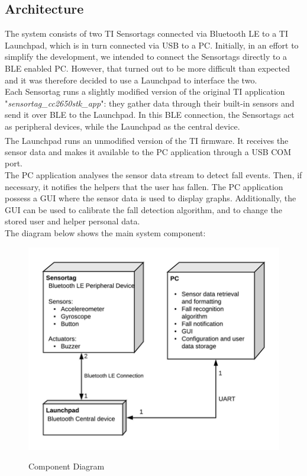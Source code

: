 \documentclass[conference,12pt]{IEEETran}
\begin{document}
\subsection{Architecture}
The system consists of two TI Sensortags connected via Bluetooth LE to a TI Launchpad, which is in turn connected via USB to a PC. Initially, in an effort to simplify the development, we intended to connect the Sensortags directly to a BLE enabled PC. However, that turned out to be more difficult than expected and it was therefore decided to use a Launchpad to interface the two.\\
Each Sensortag runs a slightly modified version of the original TI application "\textit{sensortag\_cc2650stk\_app}": they gather data through their built-in sensors and send it over BLE to the Launchpad. In this BLE connection, the Sensortags act as peripheral devices, while the Launchpad as the central device.\\
The Launchpad runs an unmodified version of the TI firmware\textsuperscript{\cite{hosttest}}. It receives the sensor data and makes it available to the PC application through a USB COM port.\\
The PC application analyses the sensor data stream to detect fall events. Then, if necessary, it notifies the helpers that the user has fallen. The PC application possess a GUI where the sensor data is used to display graphs. Additionally, the GUI can be used to calibrate the fall detection algorithm, and to change the stored user and helper personal data.\\
The diagram below shows the main system component:
\FloatBarrier
\begin{figure}[!h]
	\centering
	\caption{Component Diagram}
	\includegraphics[scale=0.7]{images/Comp_Diag2.png}
	\label{img:compdiag}
\end{figure}
\FloatBarrier
\end{document}
